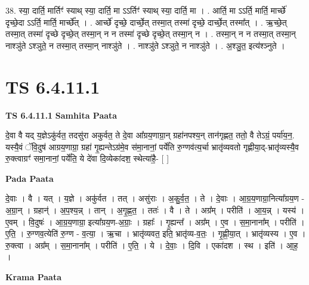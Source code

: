 \documentclass[17pt]{extarticle}
\begin{document}
38. स्या॒ दार्ति॒ मार्तिꣳ॑ स्याथ् स्या॒ दार्ति॒ मा ऽऽर्तिꣳ॑ स्याथ् स्या॒ दार्ति॒ मा । . आर्ति॒ मा ऽऽर्ति॒ मार्ति॒ मार्च्छे॑ दृच्छे॒दा ऽऽर्ति॒ मार्ति॒ मार्च्छे᳚त् । . आर्च्छे॑ दृच्छे॒ दार्च्छे॒त् तस्मा॒त् तस्मा॑ दृच्छे॒ दार्च्छे॒त् तस्मा᳚त् । . ऋ॒च्छे॒त् तस्मा॒त् तस्मा॑ दृच्छे दृच्छे॒त् तस्मा॒न् न न तस्मा॑ दृच्छे दृच्छे॒त् तस्मा॒न् न । . तस्मा॒न् न न तस्मा॒त् तस्मा॒न् नाश्ञु॑ते ऽश्ञुते॒ न तस्मा॒त् तस्मा॒न् नाश्ञु॑ते । . नाश्ञु॑ते ऽश्ञुते॒ न नाश्ञु॑ते । . अ॒श्ञु॒त॒ इत्य॑श्ञ्नुते । \newline
\pagebreak
{}

\section{ TS 6.4.11.1 }

\textbf{TS 6.4.11.1 } \newline
\textbf{Samhita Paata} \newline

दे॒वा वै यद् य॒ज्ञेऽकु॑र्वत॒ तदसु॑रा अकुर्वत॒ ते दे॒वा आ᳚ग्रय॒णाग्रा॒न् ग्रहा॑नपश्य॒न् तान॑गृह्णत॒ ततो॒ वै तेऽग्रं॒ पर्या॑य॒न॒. यस्यै॒वं ॅवि॒दुष॑ आग्रय॒णाग्रा॒ ग्रहा॑ गृ॒ह्यन्तेऽग्र॑मे॒व स॑मा॒नानां॒ पर्ये॑ति रु॒ग्णव॑त्य॒र्चा भ्रातृ॑व्यवतो गृह्णीया॒द्-भ्रातृ॑व्यस्यै॒व रु॒क्त्वाग्रꣳ॑ समा॒नानां॒ पर्ये॑ति॒ ये दे॑वा दि॒व्येका॑दश॒ स्थेत्या॑है॒- [  ] \newline

\textbf{Pada Paata} \newline

दे॒वाः । वै । यत् । य॒ज्ञे । अकु॑र्वत । तत् । असु॑राः । अ॒कु॒र्व॒त॒ । ते । दे॒वाः । आ॒ग्र॒य॒णाग्रा॒नित्या᳚ग्रय॒ण - अ॒ग्रा॒न् । ग्रहान्॑ । अ॒प॒श्य॒न्न् । तान् । अ॒गृ॒ह्ण॒त॒ । ततः॑ । वै । ते । अग्र᳚म् । परीति॑ । आ॒य॒न्न् । यस्य॑ । ए॒वम् । वि॒दुषः॑ । आ॒ग्र॒य॒णाग्रा॒ इत्या᳚ग्रय॒ण-अ॒ग्राः॒ । ग्रहाः᳚ । गृ॒ह्यन्त᳚ । अग्र᳚म् । ए॒व । स॒मा॒नाना᳚म् । परीति॑ । ए॒ति॒ । रु॒ग्णव॒त्येति॑ रु॒ग्ण - व॒त्या॒ । ऋ॒चा । भ्रातृ॑व्यवत॒ इति॒ भ्रातृ॑व्य-व॒तः॒ । गृ॒ह्णी॒या॒त् । भ्रातृ॑व्यस्य । ए॒व । रु॒क्त्वा । अग्र᳚म् । स॒मा॒नाना᳚म् । परीति॑ । ए॒ति॒ । ये । दे॒वाः॒ । दि॒वि । एका॑दश । स्थ । इति॑ । आ॒ह॒ ।  \newline


\textbf{Krama Paata} \newline
\end{document}
